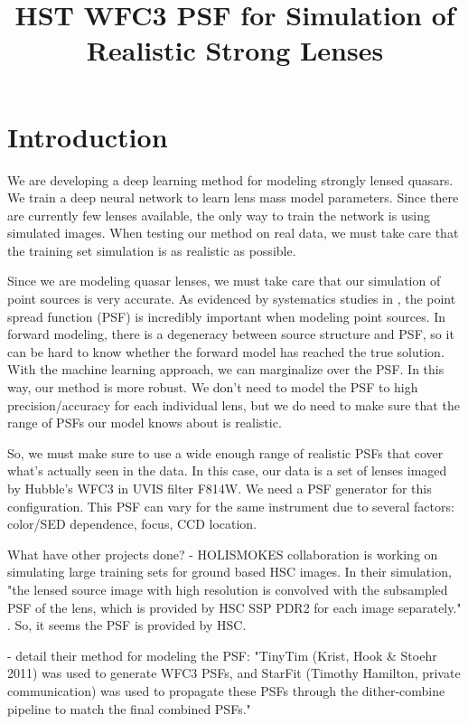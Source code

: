 \documentclass[twocolumn]{desc-tex/styles/lsstdescnote}
\begin{document}
\title{HST WFC3 PSF for Simulation of Realistic Strong Lenses}

\maketitle

\section{Introduction}

We are developing a deep learning method for modeling strongly lensed quasars. We train a deep neural network to learn lens mass model parameters. Since there are currently few lenses available, the only way to train the network is using simulated images. When testing our method on real data, we must take care that the training set simulation is as realistic as possible.

Since we are modeling quasar lenses, we must take care that our simulation of point sources is very accurate. As evidenced by systematics studies in \cite{TDCOSMOSIX}, the point spread function (PSF) is incredibly important when modeling point sources. In forward modeling, there is a degeneracy between source structure and PSF, so it can be hard to know whether the forward model has reached the true solution. With the machine learning approach, we can marginalize over the PSF. In this way, our method is more robust. We don't need to model the PSF to high precision/accuracy for each individual lens, but we do need to make sure that the range of PSFs our model knows about is realistic. 

So, we must make sure to use a wide enough range of realistic PSFs that cover what's actually seen in the data. In this case, our data is a set of lenses imaged by Hubble's WFC3 in UVIS filter F814W. We need a PSF generator for this configuration. This PSF can vary for the same instrument due to several factors: color/SED dependence, focus, CCD location.

What have other projects done? 
\hfill \break
\hfill \break
- HOLISMOKES collaboration is working on simulating large training sets for ground based HSC images. In their simulation, "the lensed source image with high resolution is convolved with the subsampled PSF of the lens, which is provided by HSC SSP PDR2 for each image separately." \citep{schuldt2021holismokes}. So, it seems the PSF is provided by HSC. 

\noindent - \cite{bate_18} detail their method for modeling the PSF: "TinyTim (Krist, Hook & Stoehr 2011) was used to generate WFC3 PSFs, and StarFit (Timothy Hamilton, private communication) was used to propagate these PSFs through the dither-combine pipeline to match the final combined PSFs."
\end{document}
